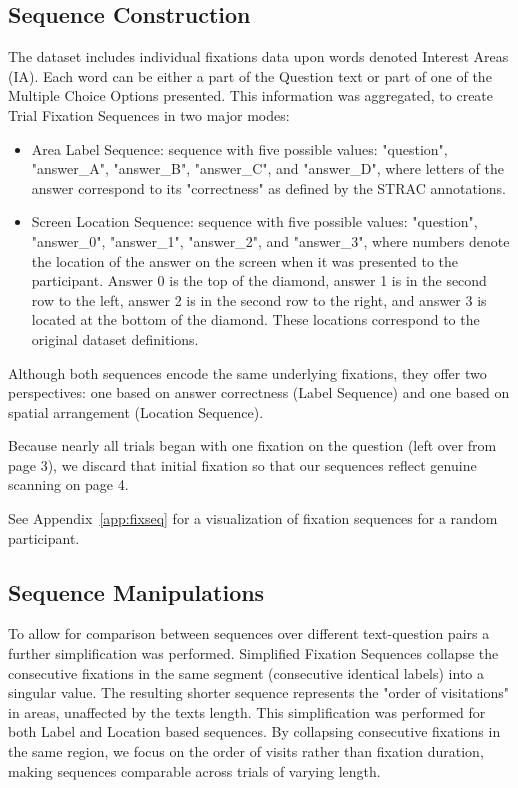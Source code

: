 \documentclass{article}
\begin{document}
    
    \subsection{Sequence Construction}
    The dataset includes individual fixations data upon words denoted Interest Areas (IA). Each word can be either a part of the Question text or part of one of the Multiple Choice Options presented. This information was aggregated, to create Trial Fixation Sequences in two major modes:
    \begin{itemize}
        \item Area Label Sequence: sequence with five possible values: "question", "answer\_A", "answer\_B", "answer\_C", and "answer\_D", where letters of the answer correspond to its "correctness" as defined by the STRAC annotations. 
        \item Screen Location Sequence: sequence with five possible values: "question", "answer\_0", "answer\_1", "answer\_2", and "answer\_3", where numbers denote the location of the answer on the screen when it was presented to the participant. Answer 0 is the top of the diamond, answer 1 is in the second row to the left, answer 2 is in the second row to the right, and answer 3 is located at the bottom of the diamond. These locations correspond to the original dataset definitions. 
    
    \end{itemize}
    Although both sequences encode the same underlying fixations, they offer two perspectives: one based on answer correctness (Label Sequence) and one based on spatial arrangement (Location Sequence). 
    
    Because nearly all trials began with one fixation on the question (left over from page 3), we discard that initial fixation so that our sequences reflect genuine scanning on page 4.

    See Appendix~\ref{app:fixseq} for a visualization of fixation sequences for a random participant. 

    
    \subsection{Sequence Manipulations}

    To allow for comparison between sequences over different text-question pairs a further simplification was performed. Simplified Fixation Sequences collapse the consecutive fixations in the same segment (consecutive identical labels) into a singular value. The resulting shorter sequence represents the "order of visitations" in areas, unaffected by the texts length. This simplification was performed for both Label and Location based sequences. By collapsing consecutive fixations in the same region, we focus on the order of visits rather than fixation duration, making sequences comparable across trials of varying length.
\end{document}
